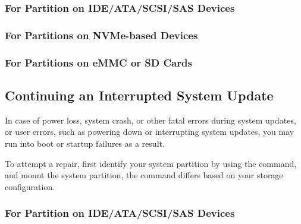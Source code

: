     \subsubsection*{For Partition on IDE/ATA/SCSI/SAS Devices}


    \subsubsection*{For Partitions on NVMe-based Devices}


    \subsubsection*{For Partitions on eMMC or SD Cards}





    \subsection{Continuing an Interrupted System Update}

    In case of power loss, system crash, or other fatal errors during system updates,
    or user errors, such as powering down or interrupting system updates,
    you may run into boot or startup failures as a result.

    To attempt a repair, first identify your system partition by using the  command,
    and mount the system partition, the command differs based on your storage configuration.

    \subsubsection*{For Partition on IDE/ATA/SCSI/SAS Devices}


